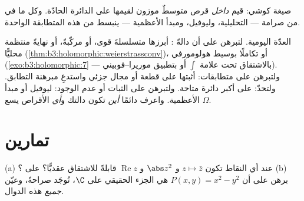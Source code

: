 \begin{omfigure}

{\small صيغة كوشي: قيم  \emph{داخل} قرص متوسطٌ
موزون لقيمها على الدائرة الحادّة. وكل ما في  من
صرامة --- التحليلية، وليوفيل، ومبدأ الأعظمية --- ينبسط من هذه
المتطابقة الواحدة.}
\end{omfigure}

\begin{method}\label{met:b3:holomorphic:toolkit}
العدّة اليومية. لتبرهن على أن دالةً : أبرزها متسلسلةَ
قوى، أو مركّبةً، أو نهايةً منتظمة محليًّا (\cref{thm:b3:holomorphic:weierstrassconv})، أو
تكاملًا بوسيط هولومورفي (\cref{exo:b3:holomorphic:7} --- بالاشتقاق تحت علامة
$\int$ أو بتطبيق موريرا--فوبيني). ولتبرهن على متطابقات: أثبتها
على قطعة أو مجال جزئي واستدعِ مبرهنة التطابق. ولتحدّ:  على أكبر دائرة متاحة. ولتبرهن على الثبات أو عدم الوجود:
ليوفيل أو مبدأ الأعظمية. واعرف دائمًا \emph{أين} تكون دالتك
 و\emph{أي} الأقراص يسع $\Omega$.
\end{method}

\section{تمارين}

\begin{exercise}[$\star$]\label{exo:b3:holomorphic:1}
(a) عند أي النقاط تكون $z \mapsto \bar z$ و $\abs z^2$ و $\operatorname{Re}z$ قابلةً
للاشتقاق عقديًّا؟  على ؟
(b) برهن على أن $P(x, y) = x^2 - y^2$ هي الجزء الحقيقي  على
$\C$، تُوجَد صراحةً، وعيّن \emph{جميع} هذه الدوال.
\end{exercise}

